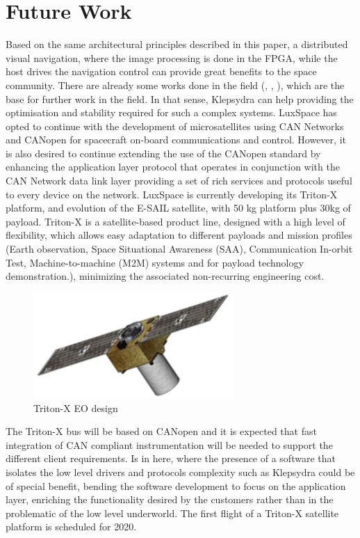 \documentclass[a4paper,twocolumn]{esapub2005} %
\begin{document}
\section{Future Work}

Based on the same architectural principles described in this paper, a distributed visual navigation, where the image processing is done in the FPGA, while the host drives the navigation control can provide great benefits to the space community. There are already some works done in the field (\cite{VIS_NAV1}, \cite{VIS_NAV2}, \cite{VIS_NAV3}), which are the base for further work in the field. In that sense, Klepsydra can help providing the optimisation and stability required for such a complex systems. LuxSpace has opted to continue with the development of microsatellites using CAN Networks and CANopen for spacecraft on-board communications and control. However, it is also desired to continue extending the use of the CANopen standard by enhancing the application layer protocol that operates in conjunction with the CAN Network data link layer providing a set of rich services and protocols useful to every device on the network. LuxSpace is currently developing its Triton-X platform, and evolution of the E-SAIL satellite, with 50 kg platform plus 30kg of payload. Triton-X is a satellite-based product line, designed with a high level of flexibility, which allows easy adaptation to different payloads and mission profiles (Earth observation, Space Situational Awareness (SAA), Communication In-orbit Test, Machine-to-machine (M2M) systems and for payload technology demonstration.), minimizing the associated non-recurring engineering cost.

\begin{figure}[H]
\centering
\includegraphics[width = 3in]{images/tritonx}
\caption{\label{fig:tritonx} Triton-X EO design}
\end{figure}

The Triton-X bus will be based on CANopen and it is expected that fast integration of CAN compliant instrumentation will be needed to support the different client requirements. Is in here, where the presence of a software that isolates the low level drivers and protocols complexity such as Klepsydra could be of special benefit, bending the software development to focus on the application layer, enriching the functionality desired by the customers rather than in the problematic of the low level underworld. The first flight of a Triton-X satellite platform is scheduled for 2020.

\FloatBarrier
 
\end{document}

